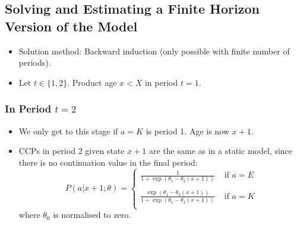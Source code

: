 \documentclass[11pt]{article}
\begin{document}
\subsection{Solving and Estimating a Finite Horizon Version of the Model}
\begin{itemize}
	\item Solution method: Backward induction (only possible with finite number of periods).
	\item Let $t\in \{1,2\}$. Product age $x<X$ in period $t=1$.
\end{itemize}

  \subsubsection*{In Period $t = 2$}
  	\begin{itemize}
  		\item We only get to this stage if $a=K$ is period 1. Age is now $x+1$.
  		\item CCPs in period 2 given state $x+1$ are the same as in a static model, since there is no continuation value in the final period:
  		\begin{equation}
  		P(a|x+1;\theta) =
  		\begin{cases}
  		\frac{1}{1+\exp{}(\theta_1 - \theta_2(x+1))} & \text{ if } a=E \\
  		& \\
  		\frac{\exp{}(\theta_1 - \theta_2(x+1))}{1+\exp{}(\theta_1 - \theta_2(x+1))} & \text{ if } a=K \\
  		\end{cases}
  		\end{equation}
  		where $\theta_0$ is normalised to zero.
  	\end{itemize}
\end{document}
